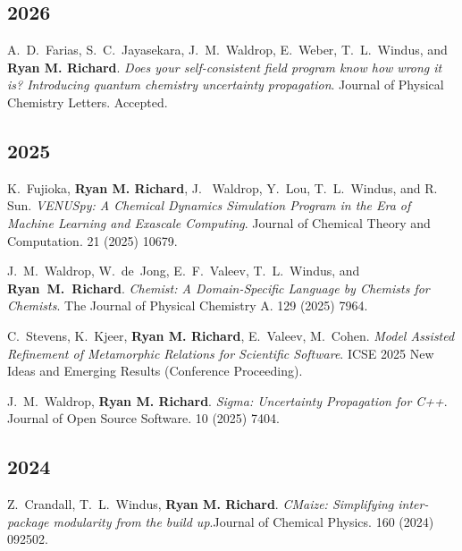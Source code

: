 \vspace{5pt}
\begin{etaremune}
\item[]{}
    \subsection{2026}
    \item{A.~D.~Farias, S.~C.~Jayasekara, J.~M.~Waldrop, E.~Weber, 
          T.~L.~Windus, and \textbf{Ryan M. Richard}. 
         \textit{Does your self-consistent field program know how wrong it is? 
         Introducing quantum chemistry uncertainty propagation}. Journal of 
        Physical Chemistry Letters. Accepted.}
        
	\subsection{2025}
	\item{K.~Fujioka, \textbf{Ryan M. Richard}, J. ~Waldrop, Y.~Lou, 
          T.~L.~Windus, and R. Sun. \textit{VENUSpy: A Chemical 
		  Dynamics Simulation Program in the Era of Machine Learning and 
          Exascale Computing}. Journal of Chemical Theory and Computation. 
          21 (2025) 10679.}
	\item{J.~M.~Waldrop, W.~de~Jong, E.~F.~Valeev, T.~L.~Windus, and 
          \textbf{Ryan~M.~Richard}. 
		  \textit{Chemist: A Domain-Specific Language by Chemists for Chemists}. 
          The Journal of Physical Chemistry A. 129 (2025) 7964.}
	\item{C.~Stevens, K.~Kjeer, \textbf{Ryan M. Richard}, E.~Valeev, M.~Cohen. 
          \textit{Model Assisted Refinement of Metamorphic Relations for 
          Scientific Software}. ICSE 2025 New Ideas and Emerging Results 
         (Conference Proceeding). }
	\item{J.~M.~Waldrop, \textbf{Ryan M. Richard}. 
          \textit{Sigma: Uncertainty Propagation for C++}. Journal of Open 
          Source Software. 10 (2025) 7404.}
	
	\subsection{2024}
	\item{Z.~Crandall, T.~L.~Windus, \textbf{Ryan M. Richard}. 
	      \textit{CMaize: Simplifying inter-package modularity from the build 
		  up}.Journal of Chemical Physics. 160 (2024) 092502.}


\end{etaremune}
